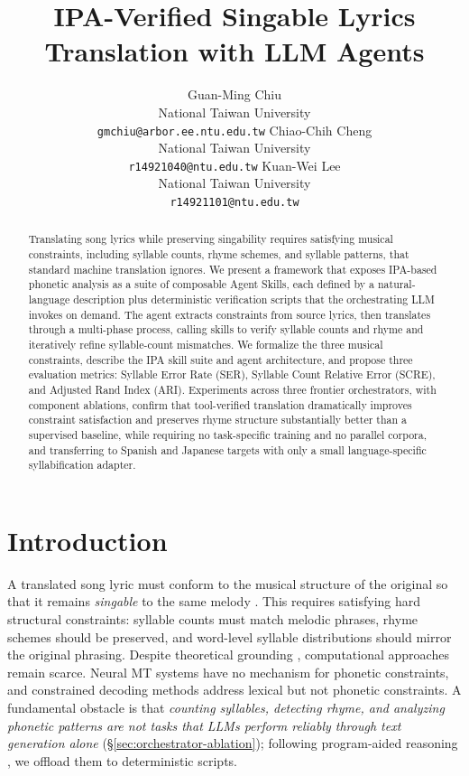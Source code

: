 \documentclass[11pt]{article}
\title{IPA-Verified Singable Lyrics Translation with LLM Agents}
\author{Guan-Ming Chiu \\
  National Taiwan University \\
  \texttt{gmchiu@arbor.ee.ntu.edu.tw}
  \And
  Chiao-Chih Cheng \\
  National Taiwan University \\
  \texttt{r14921040@ntu.edu.tw}
  \And
  Kuan-Wei Lee \\
  National Taiwan University \\
  \texttt{r14921101@ntu.edu.tw}}
\begin{document}
\maketitle

\begin{abstract}
Translating song lyrics while preserving singability requires satisfying musical constraints, including syllable counts, rhyme schemes, and syllable patterns, that standard machine translation ignores.
We present a framework that exposes IPA-based phonetic analysis as a suite of composable Agent Skills, each defined by a natural-language description plus deterministic verification scripts that the orchestrating LLM invokes on demand.
The agent extracts constraints from source lyrics, then translates through a multi-phase process, calling skills to verify syllable counts and rhyme and iteratively refine syllable-count mismatches.
We formalize the three musical constraints, describe the IPA skill suite and agent architecture, and propose three evaluation metrics: Syllable Error Rate (SER), Syllable Count Relative Error (SCRE), and Adjusted Rand Index (ARI).
Experiments across three frontier orchestrators, with component ablations, confirm that tool-verified translation dramatically improves constraint satisfaction and preserves rhyme structure substantially better than a supervised baseline, while requiring no task-specific training and no parallel corpora, and transferring to Spanish and Japanese targets with only a small language-specific syllabification adapter.
\end{abstract}

\section{Introduction}

A translated song lyric must conform to the musical structure of the original so that it remains \emph{singable} to the same melody \citep{low-2005-pentathlon}.
This requires satisfying hard structural constraints: syllable counts must match melodic phrases, rhyme schemes should be preserved, and word-level syllable distributions should mirror the original phrasing.
Despite theoretical grounding \citep{low-2005-pentathlon,franzon-2008-choices}, computational approaches remain scarce.
Neural MT systems have no mechanism for phonetic constraints, and constrained decoding methods \citep{hokamp-liu-2017-lexically,post-vilar-2018-fast} address lexical but not phonetic constraints.
A fundamental obstacle is that \emph{counting syllables, detecting rhyme, and analyzing phonetic patterns are not tasks that LLMs perform reliably through text generation alone} (\S\ref{sec:orchestrator-ablation}); following program-aided reasoning \citep{gao-etal-2023-pal}, we offload them to deterministic scripts.
\end{document}
